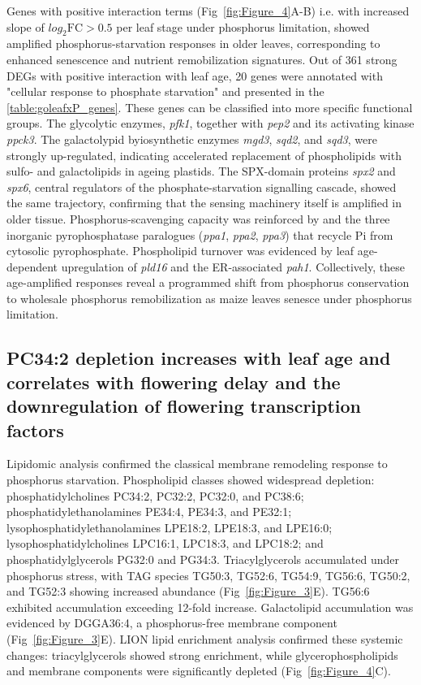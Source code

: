 \documentclass[9pt,twocolumn,twoside]{rilabRxiv}
\begin{document}
Genes with positive interaction terms (Fig~\ref{fig:Figure_4}A-B) i.e. with increased slope of $log_2{\text{FC}}>0.5$ per leaf stage under phosphorus limitation, showed amplified phosphorus-starvation responses in older leaves, corresponding to enhanced senescence and nutrient remobilization signatures.
Out of 361 strong DEGs with positive interaction with leaf age, 20 genes were annotated with "cellular response to phosphate starvation" and presented in the \ref{table:goleafxP_genes}.
These genes can be classified into more specific functional groups.
The glycolytic enzymes, \textit{pfk1}, together with \textit{pep2} and its activating kinase \textit{ppck3}.
The galactolypid byiosynthetic enzymes \textit{mgd3}, \textit{sqd2}, and \textit{sqd3}, were strongly up-regulated, indicating accelerated replacement of phospholipids with sulfo- and galactolipids in ageing plastids.
The SPX-domain proteins \textit{spx2} and \textit{spx6}, central regulators of the phosphate-starvation signalling cascade, showed the same trajectory, confirming that the sensing machinery itself is amplified in older tissue.
Phosphorus-scavenging capacity was reinforced by  and the three inorganic pyrophosphatase paralogues (\textit{ppa1}, \textit{ppa2}, \textit{ppa3}) that recycle Pi from cytosolic pyrophosphate.
Phospholipid turnover was evidenced by leaf age-dependent upregulation of  \textit{pld16} and the ER-associated \textit{pah1}.
Collectively, these age-amplified responses reveal a programmed shift from phosphorus conservation to wholesale phosphorus remobilization as maize leaves senesce under phosphorus limitation.

\subsection*{PC34:2 depletion increases with leaf age and correlates with flowering delay and the downregulation of flowering transcription factors}

Lipidomic analysis confirmed the classical membrane remodeling response to phosphorus starvation.
Phospholipid classes showed widespread depletion: phosphatidylcholines PC34:2, PC32:2, PC32:0, and PC38:6; phosphatidylethanolamines PE34:4, PE34:3, and PE32:1; lysophosphatidylethanolamines LPE18:2, LPE18:3, and LPE16:0; lysophosphatidylcholines LPC16:1, LPC18:3, and LPC18:2; and phosphatidylglycerols PG32:0 and PG34:3.
Triacylglycerols accumulated under phosphorus stress, with TAG species TG50:3, TG52:6, TG54:9, TG56:6, TG50:2, and TG52:3 showing increased abundance (Fig~\ref{fig:Figure_3}E).
TG56:6 exhibited accumulation exceeding 12-fold increase.
Galactolipid accumulation was evidenced by DGGA36:4, a phosphorus-free membrane component (Fig~\ref{fig:Figure_3}E).
LION lipid enrichment analysis confirmed these systemic changes: triacylglycerols showed strong enrichment, while glycerophospholipids and membrane components were significantly depleted (Fig~\ref{fig:Figure_4}C).  
\end{document}
